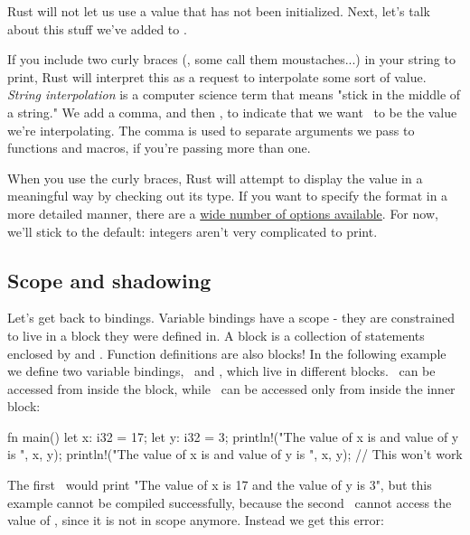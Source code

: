 Rust will not let us use a value that has not been initialized. Next, let's talk about this stuff we've added to \println.

\blank

If you include two curly braces (\code{\{\}}, some call them moustaches...) in your string to print, Rust will interpret this as 
a request to interpolate some sort of value. \emph{String interpolation} is a computer science term that means "stick in the middle
of a string." We add a comma, and then \x, to indicate that we want \x\ to be the value we're interpolating. The comma 
is used to separate arguments we pass to functions and macros, if you're passing more than one.

\blank

When you use the curly braces, Rust will attempt to display the value in a meaningful way by checking out its type. If you want 
to specify the format in a more detailed manner, there are a \href{https://doc.rust-lang.org/std/fmt/}{wide number of options
available}. For now, we'll stick to the default: integers aren't very complicated to print.

\subsection*{Scope and shadowing}

Let's get back to bindings. Variable bindings have a scope - they are constrained to live in a block they were defined in. A block 
is a collection of statements enclosed by \code{\{} and \code{\}}. Function definitions are also blocks! In the following example 
we define two variable bindings, \x\ and \y, which live in different blocks. \x\ can be accessed from inside the 
 block, while \y\ can be accessed only from inside the inner block:

\begin{rustc}
fn main() {
    let x: i32 = 17;
    {
        let y: i32 = 3;
        println!("The value of x is {} and value of y is {}", x, y);
    }
    println!("The value of x is {} and value of y is {}", x, y); // This won't work
}
\end{rustc}

The first \println\ would print "The value of x is 17 and the value of y is 3", but this example cannot be compiled
successfully, because the second \println\ cannot access the value of \y, since it is not in scope anymore. Instead 
we get this error:

